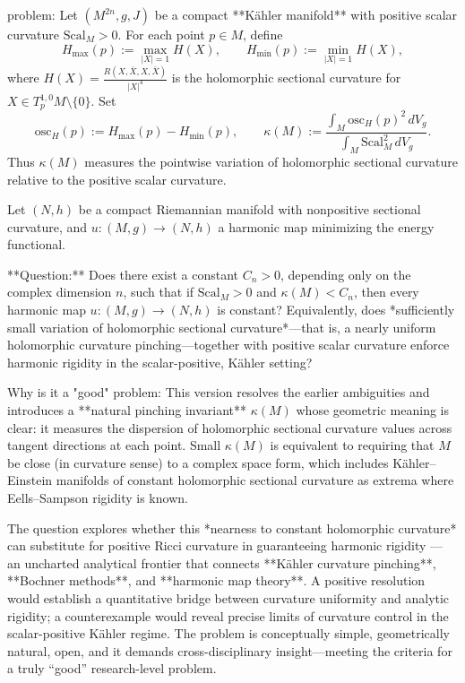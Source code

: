 problem:  
Let \((M^{2n}, g, J)\) be a compact **Kähler manifold** with positive scalar curvature \(\mathrm{Scal}_M>0\). For each point \(p\in M\), define  
\[
H_{\max}(p) := \max_{|X|=1} H(X), \qquad H_{\min}(p) := \min_{|X|=1} H(X),
\]
where \(H(X)=\frac{R(X,\bar{X},X,\bar{X})}{|X|^4}\) is the holomorphic sectional curvature for \(X\in T^{1,0}_p M\setminus\{0\}\).  
Set
\[
 \mathrm{osc}_H(p) := H_{\max}(p)-H_{\min}(p),
\qquad 
\kappa(M):=\frac{\int_M \mathrm{osc}_H(p)^2\, dV_g}{\int_M \mathrm{Scal}_M^2\, dV_g}.
\]
Thus \(\kappa(M)\) measures the pointwise variation of holomorphic sectional curvature relative to the positive scalar curvature.  

Let \((N,h)\) be a compact Riemannian manifold with nonpositive sectional curvature, and \(u:(M,g)\to(N,h)\) a harmonic map minimizing the energy functional.  

**Question:**  
Does there exist a constant \(C_n>0\), depending only on the complex dimension \(n\), such that if \(\mathrm{Scal}_M>0\) and \(\kappa(M)< C_n\), then every harmonic map \(u:(M,g)\to(N,h)\) is constant?  
Equivalently, does *sufficiently small variation of holomorphic sectional curvature*—that is, a nearly uniform holomorphic curvature pinching—together with positive scalar curvature enforce harmonic rigidity in the scalar-positive, Kähler setting?

Why is it a "good" problem:  
This version resolves the earlier ambiguities and introduces a **natural pinching invariant** \(\kappa(M)\) whose geometric meaning is clear: it measures the dispersion of holomorphic sectional curvature values across tangent directions at each point.  Small \(\kappa(M)\) is equivalent to requiring that \(M\) be close (in curvature sense) to a complex space form, which includes Kähler–Einstein manifolds of constant holomorphic sectional curvature as extrema where Eells–Sampson rigidity is known.  

The question explores whether this *nearness to constant holomorphic curvature* can substitute for positive Ricci curvature in guaranteeing harmonic rigidity — an uncharted analytical frontier that connects **Kähler curvature pinching**, **Bochner methods**, and **harmonic map theory**.  A positive resolution would establish a quantitative bridge between curvature uniformity and analytic rigidity; a counterexample would reveal precise limits of curvature control in the scalar-positive Kähler regime.  The problem is conceptually simple, geometrically natural, open, and it demands cross-disciplinary insight—meeting the criteria for a truly “good” research-level problem.